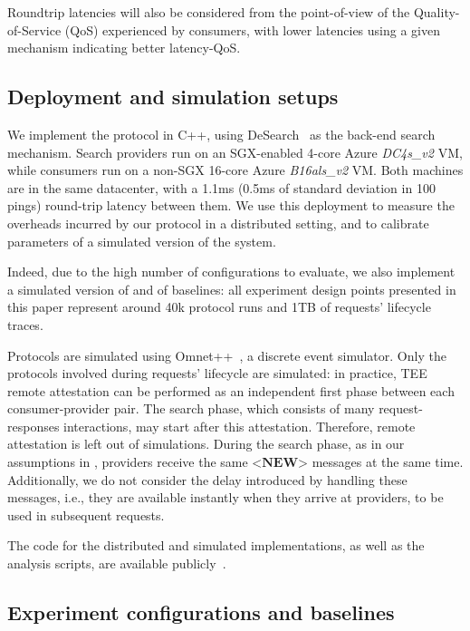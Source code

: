 Roundtrip latencies will also be considered from the point-of-view of the Quality-of-Service (QoS) experienced by consumers, with lower latencies using a given mechanism indicating better latency-QoS.

\subsection{Deployment and simulation setups}

We implement the \sysname protocol in C++, using DeSearch~\cite{liBringingDecentralizedSearch2021} as the back-end search mechanism. 
Search providers run on an SGX-enabled 4-core Azure \emph{DC4s\_v2} VM, while consumers run on a non-SGX 16-core Azure \emph{B16als\_v2} VM.
Both machines are in the same datacenter, with a 1.1ms (0.5ms of standard deviation in 100 pings) round-trip latency between them.
We use this deployment to measure the overheads incurred by our protocol in a distributed setting, and to calibrate parameters of a simulated version of the system.

Indeed, due to the high number of configurations to evaluate, we also implement a simulated version of \sysname and of baselines:
all experiment design points presented in this paper represent around 40k protocol runs and 1TB of requests' lifecycle traces.

Protocols are simulated using Omnet++~\cite{vargaOverviewOMNeTSimulation2008}, a discrete event simulator.
Only the protocols involved during requests' lifecycle are simulated: 
in practice, TEE remote attestation can be performed as an independent first phase between each consumer-provider pair.
The search phase, which consists of many request-responses interactions, may start after this attestation.
Therefore, remote attestation is left out of simulations.
During the search phase, as in our assumptions in , providers receive the same $\textbf{<NEW>}$ messages at the same time.
Additionally, we do not consider the delay introduced by handling these messages, i.e., they are available instantly when they arrive at providers, to be used in subsequent requests.

The code for the distributed and simulated implementations, as well as the analysis scripts, are available publicly~\cite{coolTEEcode}.

\subsection{Experiment configurations and baselines}

